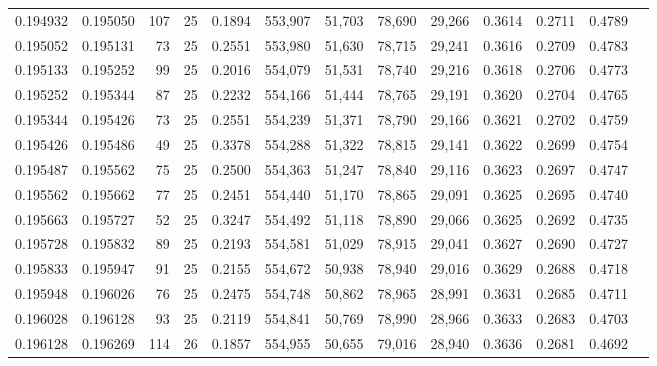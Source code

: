 \begin{tabular}{rrrrrrrrrrrrr}
0.194932 & 0.195050 &   107 &  25 &                                     0.1894 & 553,907 &  51,703 &  78,690 &  29,266 & 0.3614 & 0.2711 & 0.4789 \\
0.195052 & 0.195131 &    73 &  25 &                                     0.2551 & 553,980 &  51,630 &  78,715 &  29,241 & 0.3616 & 0.2709 & 0.4783 \\
0.195133 & 0.195252 &    99 &  25 &                                     0.2016 & 554,079 &  51,531 &  78,740 &  29,216 & 0.3618 & 0.2706 & 0.4773 \\
0.195252 & 0.195344 &    87 &  25 &                                     0.2232 & 554,166 &  51,444 &  78,765 &  29,191 & 0.3620 & 0.2704 & 0.4765 \\
0.195344 & 0.195426 &    73 &  25 &                                     0.2551 & 554,239 &  51,371 &  78,790 &  29,166 & 0.3621 & 0.2702 & 0.4759 \\
0.195426 & 0.195486 &    49 &  25 &                                     0.3378 & 554,288 &  51,322 &  78,815 &  29,141 & 0.3622 & 0.2699 & 0.4754 \\
0.195487 & 0.195562 &    75 &  25 &                                     0.2500 & 554,363 &  51,247 &  78,840 &  29,116 & 0.3623 & 0.2697 & 0.4747 \\
0.195562 & 0.195662 &    77 &  25 &                                     0.2451 & 554,440 &  51,170 &  78,865 &  29,091 & 0.3625 & 0.2695 & 0.4740 \\
0.195663 & 0.195727 &    52 &  25 &                                     0.3247 & 554,492 &  51,118 &  78,890 &  29,066 & 0.3625 & 0.2692 & 0.4735 \\
0.195728 & 0.195832 &    89 &  25 &                                     0.2193 & 554,581 &  51,029 &  78,915 &  29,041 & 0.3627 & 0.2690 & 0.4727 \\
0.195833 & 0.195947 &    91 &  25 &                                     0.2155 & 554,672 &  50,938 &  78,940 &  29,016 & 0.3629 & 0.2688 & 0.4718 \\
0.195948 & 0.196026 &    76 &  25 &                                     0.2475 & 554,748 &  50,862 &  78,965 &  28,991 & 0.3631 & 0.2685 & 0.4711 \\
0.196028 & 0.196128 &    93 &  25 &                                     0.2119 & 554,841 &  50,769 &  78,990 &  28,966 & 0.3633 & 0.2683 & 0.4703 \\
0.196128 & 0.196269 &   114 &  26 &                                     0.1857 & 554,955 &  50,655 &  79,016 &  28,940 & 0.3636 & 0.2681 & 0.4692 \\

\end{tabular}
